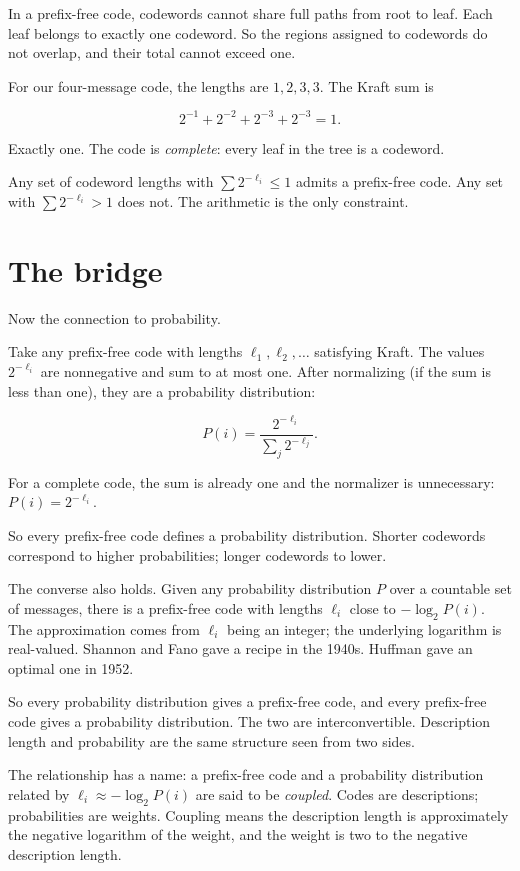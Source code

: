 In a prefix-free code, codewords cannot share full paths from root to leaf. Each leaf belongs to exactly one codeword. So the regions assigned to codewords do not overlap, and their total cannot exceed one.

For our four-message code, the lengths are $1, 2, 3, 3$. The Kraft sum is

$$2^{-1} + 2^{-2} + 2^{-3} + 2^{-3} = 1.$$

Exactly one. The code is \emph{complete}: every leaf in the tree is a codeword.

Any set of codeword lengths with $\sum 2^{-\ell_i} \leq 1$ admits a prefix-free code. Any set with $\sum 2^{-\ell_i} > 1$ does not. The arithmetic is the only constraint.

\section*{The bridge}

Now the connection to probability.

Take any prefix-free code with lengths $\ell_1, \ell_2, \ldots$ satisfying Kraft. The values $2^{-\ell_i}$ are nonnegative and sum to at most one. After normalizing (if the sum is less than one), they are a probability distribution:

$$P(i) = \frac{2^{-\ell_i}}{\sum_j 2^{-\ell_j}}.$$

For a complete code, the sum is already one and the normalizer is unnecessary: $P(i) = 2^{-\ell_i}$.

So every prefix-free code defines a probability distribution. Shorter codewords correspond to higher probabilities; longer codewords to lower.

The converse also holds. Given any probability distribution $P$ over a countable set of messages, there is a prefix-free code with lengths $\ell_i$ close to $-\log_2 P(i)$. The approximation comes from $\ell_i$ being an integer; the underlying logarithm is real-valued. Shannon and Fano gave a recipe in the 1940s. Huffman gave an optimal one in 1952.

So every probability distribution gives a prefix-free code, and every prefix-free code gives a probability distribution. The two are interconvertible. Description length and probability are the same structure seen from two sides.

The relationship has a name: a prefix-free code and a probability distribution related by $\ell_i \approx -\log_2 P(i)$ are said to be \emph{coupled}. Codes are descriptions; probabilities are weights. Coupling means the description length is approximately the negative logarithm of the weight, and the weight is two to the negative description length.

